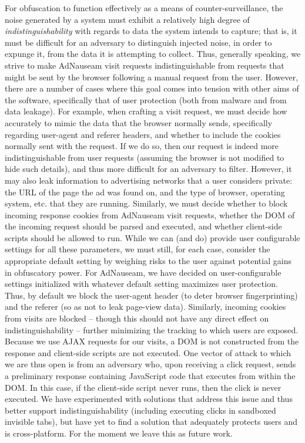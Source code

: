 \documentclass[conference]{IEEEtran}
\begin{document}
For obfuscation to function effectively as a means of counter-surveillance, the noise generated by a system must exhibit a relatively high degree of \emph{indistinguishability} with regards to data the system intends to capture; that is, it must be difficult for an adversary to distinguish injected noise, in order to expunge it, from the data it is attempting to collect. \cite{Gervais,Balsa} Thus, generally speaking, we strive to make AdNauseam visit requests indistinguishable from requests that might be sent by the browser following a manual request from the user. However, there are a number of cases where this goal comes into tension with other aims of the software, specifically that of user protection (both from malware and from data leakage). For example, when crafting a visit request, we must decide how accurately to mimic the data that the browser normally sends, specifically regarding user-agent and referer headers, and whether to include the cookies normally sent with the request. If we do so, then our request is indeed more indistinguishable from user requests (assuming the browser is not modified to hide such details), and thus more difficult for an adversary to filter. However, it may also leak information to advertising networks that a user considers private: the URL of the page the ad was found on, and the type of browser, operating system, etc. that they are running. Similarly, we must decide whether to block incoming response cookies from AdNauseam visit requests, whether the DOM of the incoming request should be parsed and executed, and whether client-side scripts should be allowed to run. While we can (and do) provide user configurable settings for all these parameters, we must still, for each case, consider the appropriate default setting by weighing risks to the user against potential gains in obfuscatory power. For AdNauseam, we have decided on user-configurable settings initialized with whatever default setting maximizes user protection. Thus, by default we block the user-agent header (to deter browser fingerprinting) and the referer (so as not to leak page-view data). Similarly, incoming cookies from visits are blocked -- though this should not have any direct effect on indistinguishability -- further minimizing the tracking to which users are exposed. Because we use AJAX requests for our visits, a DOM is not constructed from the response and client-side scripts are not executed. One vector of attack to which we are thus open is from an adversary who, upon receiving a click request, sends a preliminary response containing JavaScript code that executes from within the DOM. In this case, if the client-side script never runs, then the click is never executed. We have experimented with solutions that address this issue and thus better support indistinguishability (including executing clicks in sandboxed invisible tabs), but have yet to find a solution that adequately protects users and is cross-platform. For the moment we leave this as future work.
\end{document}
